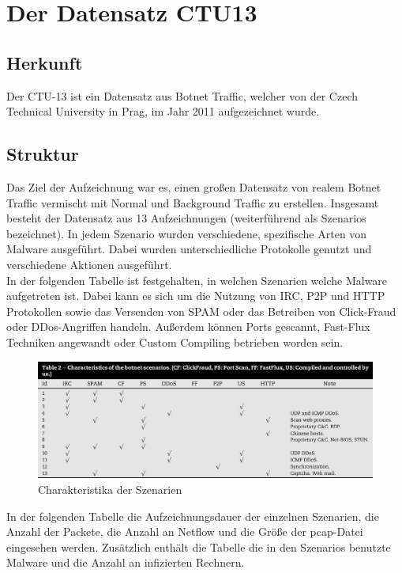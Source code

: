 \documentclass[main.tex]{subfiles}
\begin{document}
\author{Philipp Nickel}
\section{Der Datensatz CTU13}
\subsection{Herkunft}
Der CTU-13 ist ein Datensatz aus Botnet Traffic, welcher von der Czech Technical University in Prag, im Jahr 2011 aufgezeichnet wurde. 
\subsection{Struktur}
Das Ziel der Aufzeichnung war es, einen großen Datensatz von realem Botnet Traffic vermischt mit Normal und Background Traffic zu erstellen. Insgesamt besteht der Datensatz aus 13 Aufzeichnungen (weiterführend als Szenarios bezeichnet). In jedem Szenario wurden verschiedene, spezifische Arten von Malware ausgeführt. Dabei wurden unterschiedliche Protokolle genutzt und verschiedene Aktionen ausgeführt. \ \\

In der folgenden Tabelle ist festgehalten, in welchen Szenarien welche Malware aufgetreten ist. Dabei kann es sich um die Nutzung von IRC, P2P und HTTP Protokollen sowie das Versenden von SPAM oder das Betreiben von Click-Fraud oder DDos-Angriffen handeln. Außerdem können Ports gescannt, Fast-Flux Techniken angewandt oder Custom Compiling betrieben worden sein. \\
\begin{figure}[ht]
 \centering
 \includegraphics[width=1\textwidth]{images/CTU_Tabelle_1.jpg}
 \caption{Charakteristika der Szenarien}
 \label{Tabelle Charakteristika der Szenarien}
\end{figure}



In der folgenden Tabelle die Aufzeichnungsdauer der einzelnen Szenarien, die Anzahl der Packete, die Anzahl an Netflow und die Größe der pcap-Datei eingesehen werden. Zusätzlich enthält die Tabelle die in den Szenarios benutzte Malware und die Anzahl an infizierten Rechnern.
\end{document}
